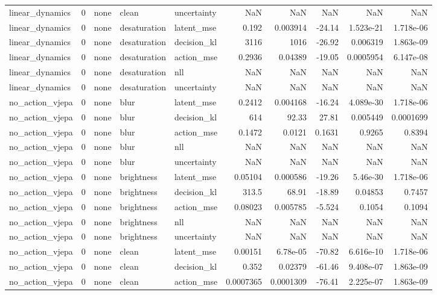 \begin{tabular}{lrlllrrrrr}
linear\_dynamics & 0 & none & clean & uncertainty & NaN & NaN & NaN & NaN & NaN \\
linear\_dynamics & 0 & none & desaturation & latent\_mse & 0.192 & 0.003914 & -24.14 & 1.523e-21 & 1.718e-06 \\
linear\_dynamics & 0 & none & desaturation & decision\_kl & 3116 & 1016 & -26.92 & 0.006319 & 1.863e-09 \\
linear\_dynamics & 0 & none & desaturation & action\_mse & 0.2936 & 0.04389 & -19.05 & 0.0005954 & 6.147e-08 \\
linear\_dynamics & 0 & none & desaturation & nll & NaN & NaN & NaN & NaN & NaN \\
linear\_dynamics & 0 & none & desaturation & uncertainty & NaN & NaN & NaN & NaN & NaN \\
no\_action\_vjepa & 0 & none & blur & latent\_mse & 0.2412 & 0.004168 & -16.24 & 4.089e-30 & 1.718e-06 \\
no\_action\_vjepa & 0 & none & blur & decision\_kl & 614 & 92.33 & 27.81 & 0.005449 & 0.0001699 \\
no\_action\_vjepa & 0 & none & blur & action\_mse & 0.1472 & 0.0121 & 0.1631 & 0.9265 & 0.8394 \\
no\_action\_vjepa & 0 & none & blur & nll & NaN & NaN & NaN & NaN & NaN \\
no\_action\_vjepa & 0 & none & blur & uncertainty & NaN & NaN & NaN & NaN & NaN \\
no\_action\_vjepa & 0 & none & brightness & latent\_mse & 0.05104 & 0.000586 & -19.26 & 5.46e-30 & 1.718e-06 \\
no\_action\_vjepa & 0 & none & brightness & decision\_kl & 313.5 & 68.91 & -18.89 & 0.04853 & 0.7457 \\
no\_action\_vjepa & 0 & none & brightness & action\_mse & 0.08023 & 0.005785 & -5.524 & 0.1054 & 0.1094 \\
no\_action\_vjepa & 0 & none & brightness & nll & NaN & NaN & NaN & NaN & NaN \\
no\_action\_vjepa & 0 & none & brightness & uncertainty & NaN & NaN & NaN & NaN & NaN \\
no\_action\_vjepa & 0 & none & clean & latent\_mse & 0.00151 & 6.78e-05 & -70.82 & 6.616e-10 & 1.718e-06 \\
no\_action\_vjepa & 0 & none & clean & decision\_kl & 0.352 & 0.02379 & -61.46 & 9.408e-07 & 1.863e-09 \\
no\_action\_vjepa & 0 & none & clean & action\_mse & 0.0007365 & 0.0001309 & -76.41 & 2.225e-07 & 1.863e-09 \\

\end{tabular}
